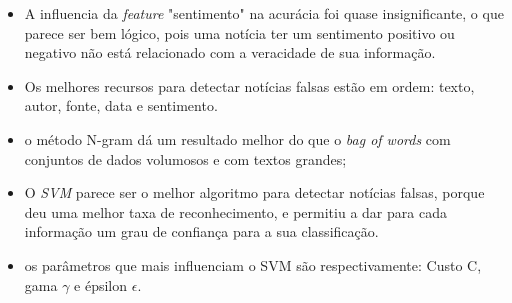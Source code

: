 \begin{itemize}
    \item A influencia da \textit{feature} "sentimento" na acurácia foi quase insignificante, o que parece ser bem lógico, pois uma notícia ter um sentimento positivo ou negativo não está relacionado com a veracidade de sua informação.
    \item Os melhores recursos para detectar notícias falsas estão em ordem: texto, autor, fonte, data e sentimento.
    \item o método N-gram dá um resultado melhor do que o \textit{bag of words} com conjuntos de dados volumosos e com textos grandes;
    \item O \textit{SVM} parece ser o melhor algoritmo para detectar notícias falsas, porque deu uma melhor taxa de reconhecimento, e permitiu a dar para cada informação um grau de confiança para a sua classificação.
    \item os parâmetros que mais influenciam o SVM são respectivamente: Custo C, gama $\gamma$ e épsilon $\epsilon$. 
    \end{itemize}
